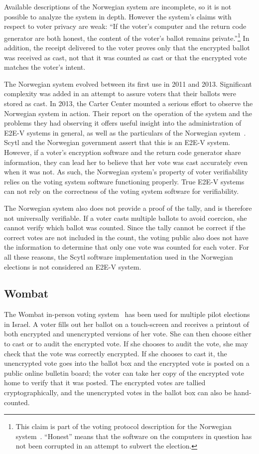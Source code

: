 Available descriptions of the Norwegian system are incomplete, so it
is not possible to analyze the system in depth. However the system's
claims with respect to voter privacy are weak: ``If the voter's
computer and the return code generator are both honest, the content of
the voter's ballot remains private.''\footnote{This claim is part of
  the voting protocol description for the Norwegian
  system~\cite{gjosteen2012}. ``Honest'' means that the software on
  the computers in question has not been corrupted in an attempt to
  subvert the election.} In addition, the receipt delivered to the
voter proves only that the encrypted ballot was received as cast, not
that it was counted as cast or that the encrypted vote matches the
voter's intent.

The Norwegian system evolved between its first use in 2011 and
2013. Significant complexity was added in an attempt to assure voters
that their ballots were stored as cast. In 2013, the Carter Center
mounted a serious effort to observe the Norwegian system in
action. Their report on the operation of the system and the problems
they had observing it offers useful insight into the administration of
E2E-V systems in general, as well as the particulars of the Norwegian
system~\cite{carter2013}. Scytl and the Norwegian government assert
that this is an E2E-V system. However, if a voter's encryption
software and the return code generator share information, they can
lead her to believe that her vote was cast accurately even when it was
not. As such, the Norwegian system's property of voter verifiability
relies on the voting system software functioning properly. True E2E-V
systems can not rely on the correctness of the voting system software
for verifiability.

The Norwegian system also does not provide a proof of the tally, and
is therefore not universally verifiable. If a voter casts multiple
ballots to avoid coercion, she cannot verify which ballot was
counted. Since the tally cannot be correct if the correct votes are
not included in the count, the voting public also does not have the
information to determine that only one vote was counted for each
voter. For all these reasons, the Scytl software implementation used
in the Norwegian elections is not considered an E2E-V system.

\subsection{Wombat}

The Wombat in-person voting system~\cite{rosen2011} has been used for
multiple pilot elections in Israel. A voter fills out her ballot on a
touch-screen and receives a printout of both encrypted and unencrypted
versions of her vote. She can then choose either to cast or to audit
the encrypted vote. If she chooses to audit the vote, she may check
that the vote was correctly encrypted. If she chooses to cast it, the
unencrypted vote goes into the ballot box and the encrypted vote is
posted on a public online bulletin board; the voter can take her copy
of the encrypted vote home to verify that it was posted. The encrypted
votes are tallied cryptographically, and the unencrypted votes in the
ballot box can also be hand-counted.

